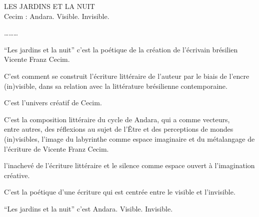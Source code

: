 LES JARDINS ET LA NUIT\\
Cecim : Andara. Visible. Invisible.

\ldots{}\ldots{}\ldots{}👤

``Les jardins et la nuit'' c'est la poétique de la création de
l'écrivain brésilien Vicente Franz Cecim.

C'est comment se construit l'écriture littéraire de l'auteur par le
biais de l'encre (in)visible, dans sa relation avec la littérature
brésilienne contemporaine.

C'est l'univers créatif de Cecim.

C'est la composition littéraire du cycle de Andara, qui a comme
vecteurs,\\
entre autres, des réflexions au sujet de l'Être et des perceptions de
mondes\\
(in)visibles, l'image du labyrinthe comme espace imaginaire et du
métalangage de l'écriture de Vicente Franz Cecim.

l'inachevé de l'écriture littéraire et le silence comme espace ouvert à
l'imagination créative.

C'est la poétique d'une écriture qui est centrée entre le visible et
l'invisible.

``Les jardins et la nuit'' c'est Andara. Visible. Invisible.
